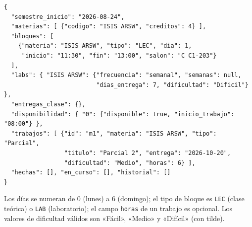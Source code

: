 \begin{verbatim}
{
  "semestre_inicio": "2026-08-24",
  "materias": [ {"codigo": "ISIS ARSW", "creditos": 4} ],
  "bloques": [
    {"materia": "ISIS ARSW", "tipo": "LEC", "dia": 1,
     "inicio": "11:30", "fin": "13:00", "salon": "C C1-203"}
  ],
  "labs": { "ISIS ARSW": {"frecuencia": "semanal", "semanas": null,
                          "dias_entrega": 7, "dificultad": "Dificil"} },
  "entregas_clase": {},
  "disponibilidad": { "0": {"disponible": true, "inicio_trabajo": "08:00"} },
  "trabajos": [ {"id": "m1", "materia": "ISIS ARSW", "tipo": "Parcial",
                 "titulo": "Parcial 2", "entrega": "2026-10-20",
                 "dificultad": "Medio", "horas": 6} ],
  "hechas": [], "en_curso": [], "historial": []
}
\end{verbatim}

Los días se numeran de 0 (lunes) a 6 (domingo); el tipo de bloque es \texttt{LEC} (clase teórica) o \texttt{LAB} (laboratorio); el campo \texttt{horas} de un trabajo es opcional. Los valores de dificultad válidos son «Fácil», «Medio» y «Difícil» (con tilde).
